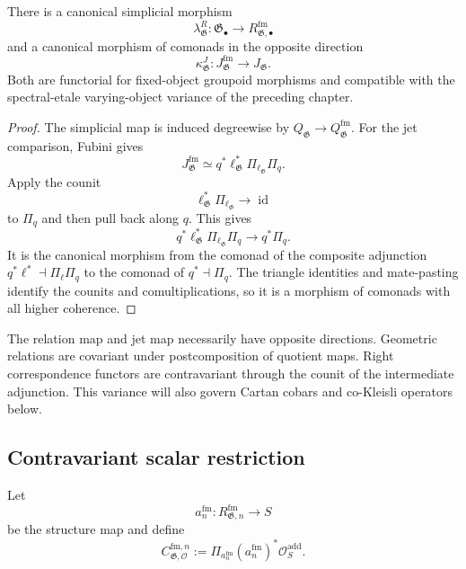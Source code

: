 \begin{proposition}
\label{prop:as-raw-formalized-jet}
There is a canonical simplicial morphism
\[
\boxed{
    \lambda^R_{\mathfrak G}:
    \mathfrak G_\bullet
    \longrightarrow
    R_{\mathfrak G,\bullet}^{\mathrm{fm}}
}
\]
and a canonical morphism of comonads in the opposite direction
\[
\boxed{
    \kappa^J_{\mathfrak G}:
    J_{\mathfrak G}^{\mathrm{fm}}
    \longrightarrow
    J_{\mathfrak G}.
}
\]
Both are functorial for fixed-object groupoid morphisms and compatible with
the spectral-etale varying-object variance of the preceding chapter.
\end{proposition}

\begin{proof}
The simplicial map is induced degreewise by
$Q_{\mathfrak G}\to Q_{\mathfrak G}^{\mathrm{fm}}$.
For the jet comparison, Fubini gives
\[
    J_{\mathfrak G}^{\mathrm{fm}}
    \simeq
    q^*\ell_{\mathfrak G}^*
    \Pi_{\ell_{\mathfrak G}}\Pi_q.
\]
Apply the counit
\[
    \ell_{\mathfrak G}^*\Pi_{\ell_{\mathfrak G}}
    \longrightarrow
    \operatorname{id}
\]
to $\Pi_q$ and then pull back along $q$.  This gives
\[
    q^*\ell_{\mathfrak G}^*
    \Pi_{\ell_{\mathfrak G}}\Pi_q
    \longrightarrow
    q^*\Pi_q.
\]
It is the canonical morphism from the comonad of the composite adjunction
$q^*\ell^*\dashv\Pi_\ell\Pi_q$ to the comonad of
$q^*\dashv\Pi_q$.  The triangle identities and mate-pasting identify the
counits and comultiplications, so it is a morphism of comonads with all higher
coherence.
\end{proof}

\begin{remark}[Variance]
The relation map and jet map necessarily have opposite directions.  Geometric
relations are covariant under postcomposition of quotient maps.  Right
correspondence functors are contravariant through the counit of the
intermediate adjunction.  This variance will also govern Cartan cobars and
co-Kleisli operators below.
\end{remark}

\subsection{Contravariant scalar restriction}

Let
\[
    a_n^{\mathrm{fm}}:
    R_{\mathfrak G,n}^{\mathrm{fm}}\longrightarrow S
\]
be the structure map and define
\[
    C_{\mathfrak G,\mathcal O}^{\mathrm{fm},n}
    :=
    \Pi_{a_n^{\mathrm{fm}}}
    (a_n^{\mathrm{fm}})^*
    \mathcal O_S^{\mathrm{add}}.
\]

